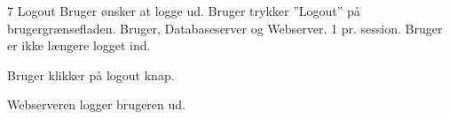 
\uchead
	{7}
	{Logout}
	{Bruger ønsker at logge ud.}
	{Bruger trykker ''Logout'' på brugergrænsefladen.}
	{Bruger, Databaseserver og Webserver.}
	{}
	{1 pr. session.}
	{Bruger er ikke længere logget ind.}

\item Bruger klikker på logout knap.

\item Webserveren logger brugeren ud.

\ucdescriptionend

		
